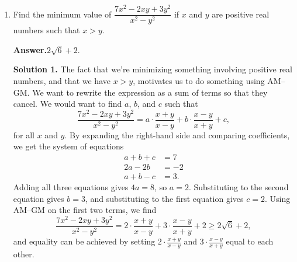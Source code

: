 \documentclass[11pt,paper=letter]{scrartcl}
\newcommand{\ans}{{\sffamily \bfseries Answer.}\;}
\newcommand{\sol}{{\sffamily \bfseries Solution.}\;}
\newcommand{\soln}[1]{{\sffamily \bfseries Solution #1.}\;}
\newcommand{\rem}[1]{{\small \sffamily \sansmath {\bfseries Remark.} #1}}
\begin{document}
\begin{enumerate}[align=left,leftmargin=*,resume]
\ans $\boxed{198}$.

\sol The key idea is that, modulo $11$, we can divide both sides of congruences by numbers that aren't multiples of $11$. For example, to divide by $5$, we can multiply both sides by $9$, because $5 \cdot 9 \equiv 1 \pmod{11}$. For example, if we add the three congruences, we can multiply both sides by $9$ to get
\begin{align*}
5a + 5b + 5c &\equiv 7abc \pmod{11} \\
a + b + c &\equiv 8abc \pmod{11}.
\end{align*}
Subtracting this from the original congruences, and then multiplying both sides by $6$ to get rid of the $2$, we find
\[
  a \equiv 2abc, \qquad b \equiv 8abc, \qquad c \equiv 9abc \pmod{11}.
\]
Multiplying all three, we get $abc \equiv (abc)^3$. As $abc \not\equiv 0$, we find that $abc \equiv 1$ or $abc \equiv 10$. Substituting these to the previous equivalences, we get that $(a, b, c) = (2, 8, 9)$ or $(a, b, c) = (9, 3, 2)$. The sum of all possible $abc$ is then $2\cdot8\cdot9 + 9\cdot3\cdot2 = 198$.

\rem{Working in congruences modulo primes are nice, because you can divide by nonzero numbers. In other words, the integers modulo a prime form a \href{https://en.wikipedia.org/wiki/Field_(mathematics)}{field}, where we can add, subtract, multiply, and divide. For small primes, we can figure out how to divide by trial and error. Compare \href{http://pmo.ph/wp-content/uploads/2014/08/19th-PMO-Qualifying-Stage-Questions-and-Answers.pdf}{PMO 2017 Qualifying I.11}, ``When $2a$ is divided by $7$, the remainder is $5$. When $3b$ is divided by $7$, the remainder is also $5$. What is the remainder when $a+b$ is divided by $7$?''}

\item Find the minimum value of $\dfrac{7x^2 - 2xy + 3y^2}{x^2 - y^2}$ if $x$ and $y$ are positive real numbers such that $x > y$.

\ans $\boxed{2\sqrt{6} + 2}$.

\soln1 The fact that we're minimizing something involving positive real numbers, and that we have $x > y$, motivates us to do something using AM--GM. We want to rewrite the expression as a sum of terms so that they cancel. We would want to find $a$, $b$, and $c$ such that
\[
  \dfrac{7x^2 - 2xy + 3y^2}{x^2 - y^2} = a \cdot\frac{x + y}{x - y} + b \cdot \frac{x-y}{x + y} + c,
\]
for all $x$ and $y$. By expanding the right-hand side and comparing coefficients, we get the system of equations
\begin{align*}
a + b + c &= 7 \\
2a - 2b &= -2 \\
a + b - c &= 3.
\end{align*}
Adding all three equations gives $4a = 8$, so $a = 2$. Substituting to the second equation gives $b = 3$, and substituting to the first equation gives $c = 2$. Using AM--GM on the first two terms, we find
\[
  \dfrac{7x^2 - 2xy + 3y^2}{x^2 - y^2} = 2\cdot\frac{x + y}{x - y} + 3\cdot \frac{x-y}{x + y} + 2 \ge 2\sqrt{6} + 2,
\]
and equality can be achieved by setting $2\cdot\frac{x + y}{x - y}$ and $3\cdot \frac{x-y}{x + y}$ equal to each other.


\end{enumerate}
\end{document}
